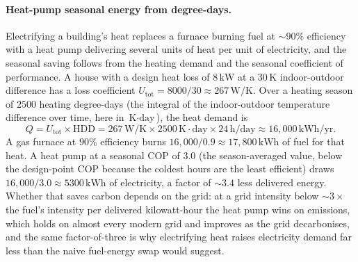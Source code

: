 \paragraph{Heat-pump seasonal energy from degree-days.} Electrifying a
building's heat replaces a furnace burning fuel at $\sim 90\%$ efficiency
with a heat pump delivering several units of heat per unit of electricity,
and the seasonal saving follows from the heating demand and the seasonal
coefficient of performance. A house with a design heat loss of $8\,\si{
\kilo\watt}$ at a $30\,\si{\kelvin}$ indoor-outdoor difference has a loss
coefficient $U_{\text{tot}} = 8000/30 \approx 267\,\si{\watt\per\kelvin}$.
Over a heating season of $2500$ heating degree-days (the integral of the
indoor-outdoor temperature difference over time, here in
$\si{\kelvin}\cdot\text{day}$), the heat demand is
\[
Q = U_{\text{tot}}\times \text{HDD} = 267\,\si{\watt\per\kelvin}\times 2500
\,\si{\kelvin}\cdot\text{day}\times 24\,\si{\hour}/\text{day}
\approx 16{,}000\,\si{\kilo\watt\hour}/\text{yr}.
\]
A gas furnace at $90\%$ efficiency burns $16{,}000/0.9 \approx 17{,}800\,\si{
\kilo\watt\hour}$ of fuel for that heat. A heat pump at a seasonal COP of
$3.0$ (the season-averaged value, below the design-point COP because the
coldest hours are the least efficient) draws $16{,}000/3.0 \approx 5300\,\si{
\kilo\watt\hour}$ of electricity, a factor of $\sim 3.4$ less delivered
energy. Whether that saves carbon depends on the grid: at a grid intensity
below $\sim 3\times$ the fuel's intensity per delivered kilowatt-hour the
heat pump wins on emissions, which holds on almost every modern grid and
improves as the grid decarbonises, and the same factor-of-three is why
electrifying heat raises electricity demand far less than the naive
fuel-energy swap would suggest.

